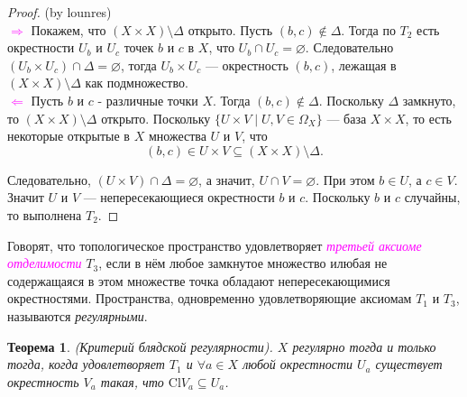 \documentclass[a4paper,100pt]{article}
\theoremstyle{indented}
\newtheorem{theorem}{Теорема}
\begin{document}
\begin{proof}
    (by lounres) \\

    \textcolor{magenta}{$\Rightarrow$} Покажем, что $(X \times X) \setminus \Delta$ открыто. Пусть $(b, c) \notin \Delta$. Тогда по $T_2$ есть окрестности $U_b$ и $U_c$ точек $b$ и $c$ в $X$, что $U_b \cap U_c = \varnothing$. Следовательно $(U_b \times U_c) \cap \Delta = \varnothing$, тогда $U_b \times U_c$ --- окрестность $(b, c)$, лежащая в $(X \times X) \setminus \Delta$ как подмножество. \\

    \textcolor{magenta}{$\Leftarrow$} Пусть $b$ и $c$ - различные точки $X$. Тогда $(b, c) \notin \Delta$. Поскольку $\Delta$ замкнуто, то $(X \times X) \setminus \Delta$ открыто. Поскольку $\{U \times V \mid U, V \in \Omega_X\}$ --- база $X \times X$, то есть некоторые открытые в $X$ множества $U$ и $V$, что
        \[
            (b, c) \in U \times V \subseteq (X \times X) \setminus \Delta.
        \]
            
        Следовательно, $(U \times V) \cap \Delta = \varnothing$, а значит, $U \cap V = \varnothing$. При этом $b \in U$, а $c \in V$. Значит $U$ и $V$ --- непересекающиеся окрестности $b$ и $c$. Поскольку $b$ и $c$ случайны, то выполнена $T_2$. 
\end{proof}

Говорят, что топологическое пространство удовлетворяет \textcolor{magenta}{\textit{третьей аксиоме отделимости}} $T_3$, если в нём любое замкнутое множество илюбая не содержащаяся в этом множестве точка обладают непересекающимися окрестностями. Пространства, одновременно удовлетворяющие аксиомам $T_1$ и $T_3$, называются \textit{регулярными}.\\

\begin{theorem}
    (Критерий блядской регулярности). $X$ регулярно тогда и только тогда, когда удовлетворяет $T_1$ и $\forall a\in X $ любой окрестности $U_a$ существует окрестность $V_a$ такая, что $\text{Cl}V_a\subseteq U_a$.
\end{theorem}
\end{document}
